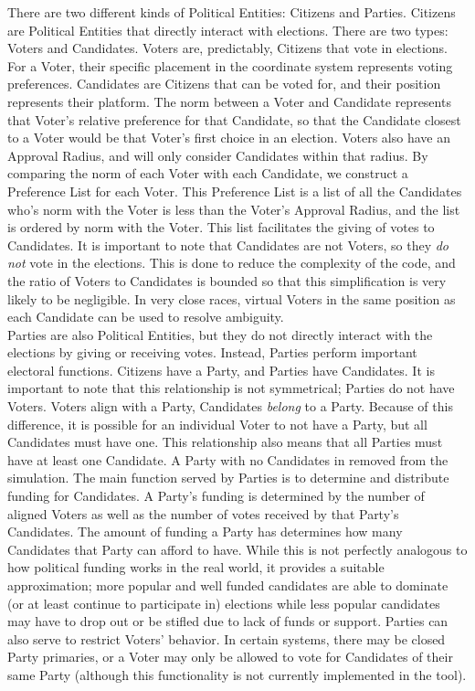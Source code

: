 \documentclass[12pt]{article}
\begin{document}
\qquad There are two different kinds of Political Entities: Citizens and Parties. Citizens are Political Entities that directly interact with elections. There are two types: Voters and Candidates. Voters are, predictably, Citizens that vote in elections. For a Voter, their specific placement in the coordinate system represents voting preferences. Candidates are Citizens that can be voted for, and their position represents their platform. The norm between a Voter and Candidate represents that Voter's relative preference for that Candidate, so that the Candidate closest to a Voter would be that Voter's first choice in an election. Voters also have an Approval Radius, and will only consider Candidates within that radius. By comparing the norm of each Voter with each Candidate, we construct a Preference List for each Voter. This Preference List is a list of all the Candidates who's norm with the Voter is less than the Voter's Approval Radius, and the list is ordered by norm with the Voter. This list facilitates the giving of votes to Candidates. It is important to note that Candidates are not Voters, so they \textit{do not} vote in the elections. This is done to reduce the complexity of the code, and the ratio of Voters to Candidates is bounded so that this simplification is very likely to be negligible. In very close races, virtual Voters in the same position as each Candidate can be used to resolve ambiguity. \\

\qquad Parties are also Political Entities, but they do not directly interact with the elections by giving or receiving votes. Instead, Parties perform important electoral functions. Citizens have a Party, and Parties have Candidates. It is important to note that this relationship is not symmetrical; Parties do not have Voters. Voters align with a Party, Candidates \textit{belong} to a Party. Because of this difference, it is possible for an individual Voter to not have a Party, but all Candidates must have one. This relationship also means that all Parties must have at least one Candidate. A Party with no Candidates in removed from the simulation. The main function served by Parties is to determine and distribute funding for Candidates. A Party's funding is determined by the number of aligned Voters as well as the number of votes received by that Party's Candidates. The amount of funding a Party has determines how many Candidates that Party can afford to have. While this is not perfectly analogous to how political funding works in the real world, it provides a suitable approximation; more popular and well funded candidates are able to dominate (or at least continue to participate in) elections while less popular candidates may have to drop out or be stifled due to lack of funds or support. Parties can also serve to restrict Voters' behavior. In certain systems, there may be closed Party primaries, or a Voter may only be allowed to vote for Candidates of their same Party (although this functionality is not currently implemented in the tool). \\
\end{document}
